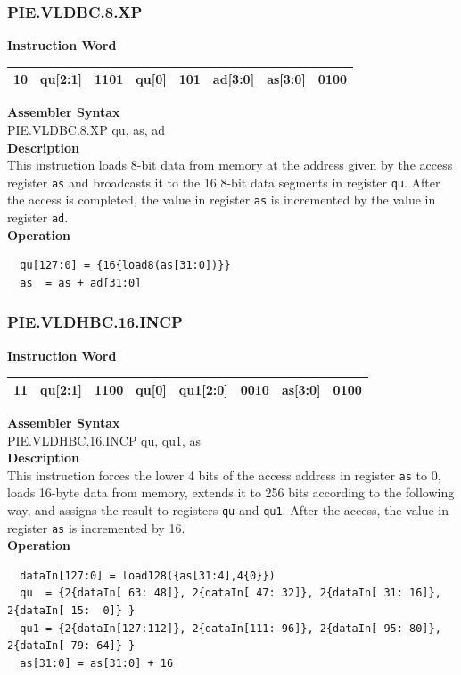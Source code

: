 \newpage
\subsubsection{PIE.VLDBC.8.XP}\label{instruction:PIEVLDBC8XP}
\setlength\tabcolsep{6pt}
\textbf{Instruction Word} \\
\begin{tabular}{|c|c|c|c|c|c|c|c|}
	\hline
	10 & qu[2:1] & 1101 & qu[0] & 101 & ad[3:0] & as[3:0] & 0100 \\
	\hline
\end{tabular}

\textbf{Assembler Syntax} \\
PIE.VLDBC.8.XP qu, as, ad \\
\textbf{Description} \\
This instruction loads 8-bit data from memory at the address given by the access register \lstinline{as} and broadcasts it to the 16 8-bit data segments in register \lstinline{qu}. After the access is completed, the value in register \lstinline{as} is incremented by the value in register \lstinline{ad}.\\
\textbf{Operation}
\begin{lstlisting}
  qu[127:0] = {16{load8(as[31:0])}}
  as  = as + ad[31:0]
\end{lstlisting}

\newpage
\subsubsection{PIE.VLDHBC.16.INCP}\label{instruction:PIEVLDHBC16INCP}
\setlength\tabcolsep{6pt}
\textbf{Instruction Word} \\
\begin{tabular}{|c|c|c|c|c|c|c|c|}
	\hline
	11 & qu[2:1] & 1100 & qu[0] & qu1[2:0] & 0010 & as[3:0] & 0100 \\
	\hline
\end{tabular}

\textbf{Assembler Syntax} \\
PIE.VLDHBC.16.INCP qu, qu1, as \\
\textbf{Description} \\
This instruction forces the lower 4 bits of the access address in register \lstinline{as} to 0, loads 16-byte data from memory, extends it to 256 bits according to the following way, and assigns the result to registers \lstinline{qu} and \lstinline{qu1}. After the access, the value in register \lstinline{as} is incremented by 16.\\
\textbf{Operation}
\begin{lstlisting}
  dataIn[127:0] = load128({as[31:4],4{0}})
  qu  = {2{dataIn[ 63: 48]}, 2{dataIn[ 47: 32]}, 2{dataIn[ 31: 16]}, 2{dataIn[ 15:  0]} }
  qu1 = {2{dataIn[127:112]}, 2{dataIn[111: 96]}, 2{dataIn[ 95: 80]}, 2{dataIn[ 79: 64]} }
  as[31:0] = as[31:0] + 16
\end{lstlisting}

